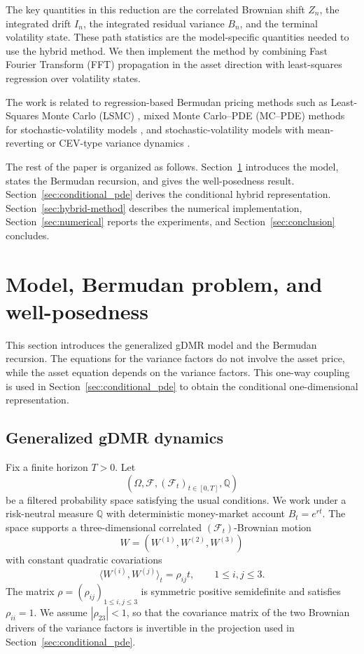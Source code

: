 \documentclass[pdflatex,sn-mathphys-num]{sn-jnl}
\theoremstyle{thmstyleone}%
\theoremstyle{thmstylethree}%
\theoremstyle{thmstyletwo}%
\newcommand{\Q}{\mathbb Q}
\newcommand{\F}{\mathcal F}
\begin{document}
The key quantities in this reduction are the correlated Brownian shift $Z_n$,
the integrated drift $I_n$, the integrated residual variance $B_n$, and the
terminal volatility state. These path statistics are the model-specific
quantities needed to use the hybrid method. We then implement the method by
combining Fast Fourier Transform (FFT) propagation in the asset direction with
least-squares regression over volatility states.

The work is related to regression-based Bermudan pricing methods such as
Least-Squares Monte Carlo (LSMC)
\cite{longstaff2001valuing,tsitsiklis2001regression,clement2002analysis},
mixed Monte Carlo--PDE (MC--PDE) methods for stochastic-volatility models
\cite{loeper2009mixed,lipp2013mixing,cozma2017mixed,farahany2020mixing}, and
stochastic-volatility models with mean-reverting or CEV-type variance dynamics
\cite{heston1993closedform,cir1985termstructure,gatheral2006volsurface,
bayer2013fast,cox1975cev,chan1992empirical,yamada1971uniqueness}.

The rest of the paper is organized as follows. Section~\ref{sec:model}
introduces the model, states the Bermudan recursion, and gives the
well-posedness result. Section~\ref{sec:conditional_pde} derives the conditional
hybrid representation. Section~\ref{sec:hybrid-method} describes the numerical
implementation, Section~\ref{sec:numerical} reports the experiments, and
Section~\ref{sec:conclusion} concludes.



\section{Model, Bermudan problem, and well-posedness}\label{sec:model}

This section introduces the generalized gDMR model and the Bermudan recursion.
The equations for the variance factors do not involve the asset price, while
the asset equation depends on the variance factors. This one-way coupling is
used in Section~\ref{sec:conditional_pde} to obtain the conditional
one-dimensional representation.

\subsection{Generalized gDMR dynamics}

Fix a finite horizon $T>0$. Let
$$
(\Omega,\F,(\F_t)_{t\in[0,T]},\Q)
$$
be a filtered probability space satisfying the usual conditions. We work under a
risk-neutral measure $\Q$ with deterministic money-market account $B_t=e^{rt}$. The
space supports a three-dimensional correlated $(\F_t)$-Brownian motion
$$
W=(W^{(1)},W^{(2)},W^{(3)})
$$
with constant quadratic covariations
$$
\langle W^{(i)},W^{(j)}\rangle_t=\rho_{ij}t,\qquad 1\le i,j\le 3.
$$
The matrix $\rho=(\rho_{ij})_{1\le i,j\le 3}$ is symmetric positive
semidefinite and satisfies $\rho_{ii}=1$. We assume $|\rho_{23}|<1$, so that
the covariance matrix of the two Brownian drivers of the variance factors is
invertible in the projection used in Section~\ref{sec:conditional_pde}.
\end{document}
